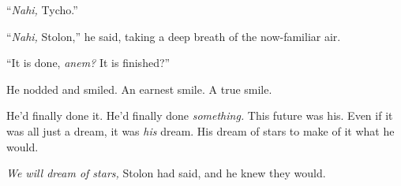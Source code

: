 ``\emph{Nahi,} Tycho.''

``\emph{Nahi,} Stolon,'' he said, taking a deep breath of the now-familiar air.

``It is done, \emph{anem?} It is finished?''

He nodded and smiled. An earnest smile. A true smile.

He'd finally done it. He'd finally done \emph{something.} This future was his. Even if it was all just a dream, it was \emph{his} dream. His dream of stars to make of it what he would.

\emph{We will dream of stars,} Stolon had said, and he knew they would.
